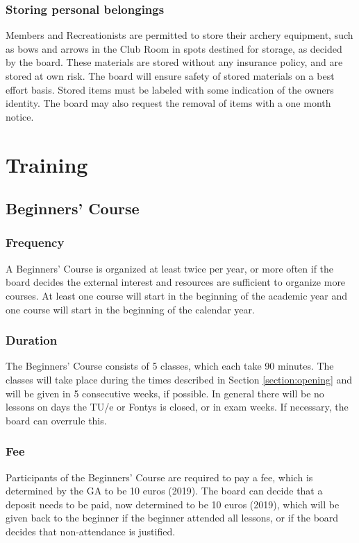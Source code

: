 \documentclass[a4paper]{article}
\begin{document}
\subsubsection{Storing personal belongings}
Members and Recreationists are permitted to store their archery equipment, such as bows and arrows in the Club Room in spots destined for storage, as decided by the board. These materials are stored without any insurance policy, and are stored at own risk. The board will ensure safety of stored materials on a best effort basis. Stored items must be labeled with some indication of the owners identity. The board may also request the removal of items with a one month notice.


\section{Training}
\subsection{Beginners' Course}
\subsubsection{Frequency}
A Beginners' Course is organized at least twice per year, or more often if the board decides the external interest and resources are sufficient to organize more courses. At least one course will start in the beginning of the academic year and one course will start in the beginning of the calendar year.

\subsubsection{Duration}
The Beginners' Course consists of 5 classes, which each take 90 minutes. The classes will take place during the times described in Section \ref{section:opening} and will be given in 5 consecutive weeks, if possible. In general there will be no lessons on days the TU/e or Fontys is closed, or in exam weeks. If necessary, the board can overrule this.

\subsubsection{Fee}
Participants of the Beginners' Course are required to pay a fee, which is determined by the GA to be 10 euros {\g (2019)}. The board can decide that a deposit needs to be paid, now determined to be 10 euros {\g (2019)}, which will be given back to the beginner if the beginner attended all lessons, or if the board decides that non-attendance is justified.
\end{document}
